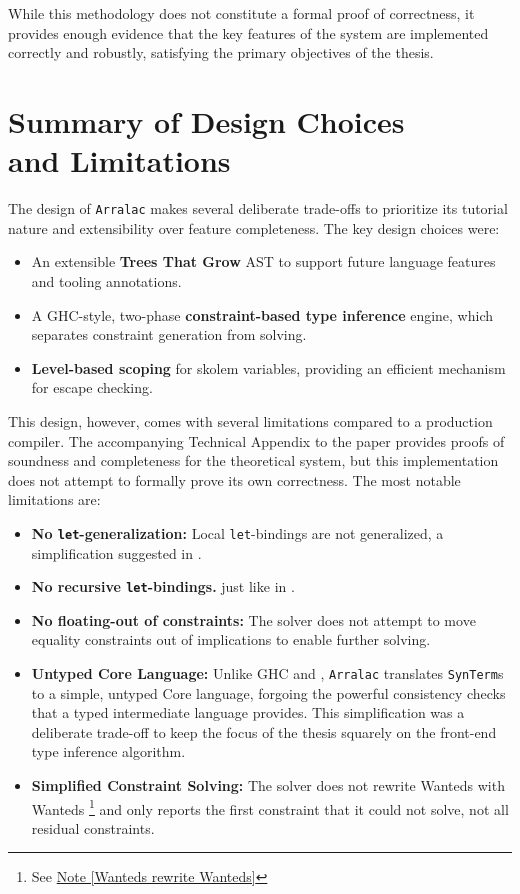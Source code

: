While this methodology does not constitute a formal proof of correctness, it provides enough evidence that the key features of the system are implemented correctly and robustly, satisfying the primary objectives of the thesis.

\section[Summary of Design Choices and Limitations]{Summary of Design Choices \\ and Limitations}
\label{sec:Design:Summary}

The design of \texttt{Arralac} makes several deliberate trade-offs to prioritize its tutorial nature and extensibility over feature completeness. The key design choices were:
\begin{itemize}
    \item An extensible \textbf{Trees That Grow} AST to support future language features and tooling annotations.
    \item A GHC-style, two-phase \textbf{constraint-based type inference} engine, which separates constraint generation from solving.
    \item \textbf{Level-based scoping} for skolem variables, providing an efficient mechanism for escape checking.
\end{itemize}

This design, however, comes with several limitations compared to a production compiler. The accompanying Technical Appendix to the paper \cite{practical-type-inference-proofs} provides proofs of soundness and completeness for the theoretical system, but this implementation does not attempt to formally prove its own correctness. The most notable limitations are:
\begin{itemize}
    \item \textbf{No \texttt{let}-generalization:} Local \texttt{let}-bindings are not generalized, a simplification suggested in \cite{vytiniotis-outsideinx-2011}.
    \item \textbf{No recursive \texttt{let}-bindings.} just like in \cite{jones-practical-2007}.
    \item \textbf{No floating-out of constraints:} The solver does not attempt to move equality constraints out of implications to enable further solving.
    \item \textbf{Untyped Core Language:} Unlike GHC and \cite{jones-practical-2007}, \texttt{Arralac} translates \texttt{SynTerm}s to a simple, untyped Core language, forgoing the powerful consistency checks that a typed intermediate language provides. This simplification was a deliberate trade-off to keep the focus of the thesis squarely on the front-end type inference algorithm.
    \item \textbf{Simplified Constraint Solving:} The solver does not rewrite Wanteds with Wanteds \footnote{See \href{https://github.com/ghc/ghc/blob/ed38c09bd89307a7d3f219e1965a0d9743d0ca73/compiler/GHC/Tc/Types/Constraint.hs\#L2415}{Note [Wanteds rewrite Wanteds]}} and only reports the first constraint that it could not solve, not all residual constraints.
\end{itemize}
